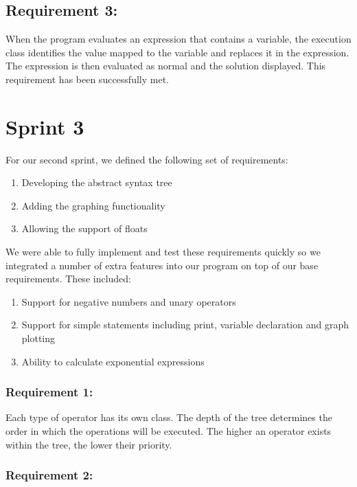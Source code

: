 \documentclass[a4paper, oneside, 11pt]{report}
\begin{document}
\subsection{Requirement 3:}

When the program evaluates an expression that contains a variable, the execution class identifies the value mapped to the variable and replaces it in the expression. The expression is then evaluated as normal and the solution displayed.
This requirement has been successfully met.

\section{Sprint 3}

For our second sprint, we defined the following set of requirements:

\begin{enumerate}
\item Developing the abstract syntax tree
\item Adding the graphing functionality
\item Allowing the support of floats
\end{enumerate}

We were able to fully implement and test these requirements quickly so we integrated
a number of extra features into our program on top of our base requirements. These
included:
\begin{enumerate}
\item Support for negative numbers and unary operators
\item Support for simple statements including print, variable declaration and graph plotting
\item  Ability to calculate exponential expressions
\end{enumerate}

\subsubsection{Requirement 1:}

Each type of operator has its own class. The depth of the tree determines the order in which the operations will be executed. The higher an operator exists within the tree, the lower their priority.

\subsubsection {Requirement 2:}
\end{document}
